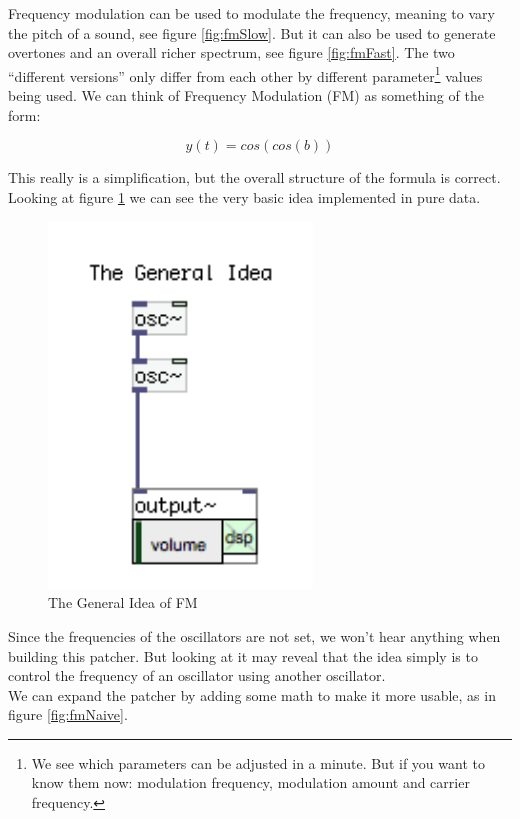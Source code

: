 Frequency modulation can be used to modulate the frequency, meaning to vary the pitch of a sound, see figure \ref{fig:fmSlow}. But it can also be used to generate overtones and an overall richer spectrum, see figure \ref{fig:fmFast}. The two ``different versions'' only differ from each other by different parameter\footnote{We see which parameters can be adjusted in a minute. But if you want to know them now: modulation frequency, modulation amount and carrier frequency.} values being used.
We can think of Frequency Modulation (FM) as something of the form:

\begin{equation}
	y(t) = cos(cos(b))
\end{equation}

This really is a simplification, but the overall structure of the formula is correct.
Looking at figure \ref{fig:fmIdea} we can see the very basic idea implemented in pure data.
\begin{figure}[H]
	\begin{center}
		\includegraphics[width = 7cm]{img/FMgeneral.png}
		\caption{The General Idea of FM}
		\label{fig:fmIdea}
	\end{center}
\end{figure}

Since the frequencies of the oscillators are not set, we won't hear anything when building this patcher. But looking at it may reveal that the idea simply is to control the frequency of an oscillator using another oscillator.\\
We can expand the patcher by adding some math to make it more usable, as in figure \ref{fig:fmNaive}.

